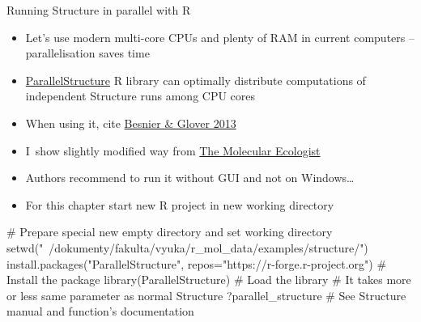 \documentclass[compress, ucs, xelatex, 11pt, xcolor=svgnames,
  hyperref={
    bookmarks=true,
    unicode=true,
    colorlinks=true,
    pdftitle={Molecular data in R},
    plainpages=false,
    pdfauthor={Vojtech Zeisek},
    pdfsubject={Course about phylogeny and evolution in R},
    pdfcreator={XeLaTeX},
    pdfkeywords={R, evolution, phylogeny, molecular data},
    linkcolor=Tomato,
    anchorcolor=SaddleBrown,
    citecolor=Goldenrod,
    filecolor=DarkMagenta,
    menucolor=Sienna,
    urlcolor=DarkTurquoise,
    pdftex},
  url={hyphens, lowtilde} %
  ]{beamer}
\begin{document}
\begin{frame}[fragile]{Running Structure in parallel with R}
  \begin{itemize}
    \item Let's use modern multi-core CPUs and plenty of RAM in current computers -- parallelisation saves time
    \item \href{https://r-forge.r-project.org/R/?group_id=1636}{ParallelStructure} R library can optimally distribute computations of independent Structure runs among CPU cores
    \item When using it, cite \href{http://www.plosone.org/article/info\%3Adoi\%2F10.1371\%2Fjournal.pone.0070651}{Besnier \& Glover 2013}
    \item I~show slightly modified way from \href{https://www.molecularecologist.com/2013/09/using-r-to-run-parallel-analyses-of-population-genetic-data-in-structure-parallelstructure/}{The Molecular Ecologist}
    \item Authors recommend to run it without GUI and not on Windows\ldots
    \item For this chapter start new R project in new working directory
  \end{itemize}
  \begin{spluscode}
    # Prepare special new empty directory and set working directory
    setwd("~/dokumenty/fakulta/vyuka/r_mol_data/examples/structure/")
    install.packages("ParallelStructure",
      repos="https://r-forge.r-project.org") # Install the package
    library(ParallelStructure) # Load the library
    # It takes more or less same parameter as normal Structure
    ?parallel_structure # See Structure manual and function's documentation
  \end{spluscode}
\end{frame}
\end{document}
